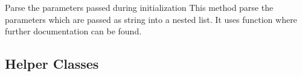 \documentclass[letterpaper,10pt,english]{sphinxmanual}
\begin{document}
\begin{fulllineitems}
\begin{fulllineitems}
\begin{quote}
\begin{description}
\end{description}\end{quote}

\end{fulllineitems}


\begin{fulllineitems}
\label{\detokenize{Classes:pysimrel.Simrel.parse_parameters}}
Parse the parameters passed during initialization
This method parse the parameters which are passed as string into
a nested list. It uses  function where further
documentation can be found.

\end{fulllineitems}


\end{fulllineitems}



\subsection{Helper Classes}
\label{\detokenize{Classes:helper-classes}}
\end{document}
